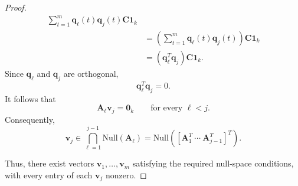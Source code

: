 \documentclass[journal,draftcls,onecolumn]{IEEEtran}
\theoremstyle{mystyle}
\newcommand{\aditya}[1]{\marginpar{+}{\bf Aditya's remark}: {\em #1}}
\begin{document}
\begin{proof}
\[\begin{aligned}
\sum_{t=1}^{m}
\mathbf{q}_\ell(t)\mathbf{q}_j(t)\mathbf{C}\mathbf{1}_k\\
&=
\left(
\sum_{t=1}^{m}\mathbf{q}_\ell(t)\mathbf{q}_j(t)
\right)
\mathbf{C}\mathbf{1}_k\\
&=
\left(
\mathbf{q}_\ell^T\mathbf{q}_j
\right)
\mathbf{C}\mathbf{1}_k.
\end{aligned}
\]
Since $\mathbf{q}_\ell$ and $\mathbf{q}_j$ are orthogonal,
\[
\mathbf{q}_\ell^T\mathbf{q}_j=0.
\]
It follows that
\[
\mathbf{A}_\ell\mathbf{v}_j
=
\mathbf{0}_k
\qquad
\text{for every }\ell<j.
\]
Consequently,
\[
\mathbf{v}_j
\in
\bigcap_{\ell=1}^{j-1}
\text{Null}(\mathbf{A}_\ell)
=
\text{Null}\!\left(
\left[
\mathbf{A}_1^T\ \cdots\ \mathbf{A}_{j-1}^T
\right]^T
\right).
\]

Thus, there exist vectors
$\mathbf{v}_1,\ldots,\mathbf{v}_m$ satisfying the required null-space conditions, with every entry of each $\mathbf{v}_j$ nonzero.
\end{proof}


\end{document}
